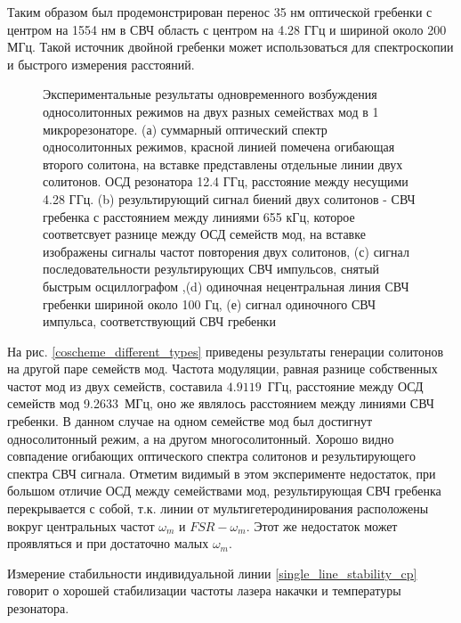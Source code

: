 Таким образом был продемонстрирован перенос 35 нм оптической гребенки с центром на 1554 нм в СВЧ область с центром на 4.28 ГГц и шириной около 200 МГц. Такой источник двойной гребенки может использоваться для спектроскопии и быстрого измерения расстояний.

\begin{figure}[ht]
\begin{minipage}[ht]{1\linewidth}
\end{minipage}
\caption{Экспериментальные результаты одновременного возбуждения односолитонных режимов на двух разных семействах мод в 1 микрорезонаторе. (а) суммарный оптический спектр односолитонных режимов, красной линией помечена огибающая второго солитона, на вставке представлены отдельные линии двух солитонов. ОСД резонатора 12.4 ГГц, расстояние между несущими 4.28 ГГц. (b) результирующий сигнал биений двух солитонов - СВЧ гребенка с расстоянием между линиями 655 кГц, которое соответсвует разнице между ОСД семейств мод, на вставке изображены сигналы частот повторения двух солитонов, (с) сигнал последовательности результирующих СВЧ импульсов, снятый быстрым осциллографом ,(d) одиночная нецентральная линия СВЧ гребенки шириной около 100 Гц, (е) сигнал одиночного СВЧ импульса, соответствующий СВЧ гребенки}
\label{Co_Scheme_results}
\end{figure}

На рис. \ref{coscheme_different_types} приведены результаты генерации солитонов на другой паре семейств мод. Частота модуляции, равная разнице собственных частот мод из двух семейств, составила $4.9119$~ГГц, расстояние между ОСД семейств мод 9.2633~МГц, оно же являлось расстоянием между линиями СВЧ гребенки. В данном случае на одном семействе мод был достигнут односолитонный режим, а на другом многосолитонный. Хорошо видно совпадение огибающих оптического спектра солитонов и результирующего спектра СВЧ сигнала. Отметим видимый в этом эксперименте недостаток, при большом отличие ОСД между семействами мод, результирующая СВЧ гребенка перекрывается с собой, т.к. линии от мультигетеродинирования расположены вокруг центральных частот $\omega_m$ и $FSR-\omega_m$. Этот же недостаток может проявляться и при достаточно малых $\omega_m$.

Измерение стабильности индивидуальной линии \ref{single_line_stability_cp} говорит о хорошей стабилизации частоты лазера накачки и температуры резонатора.

